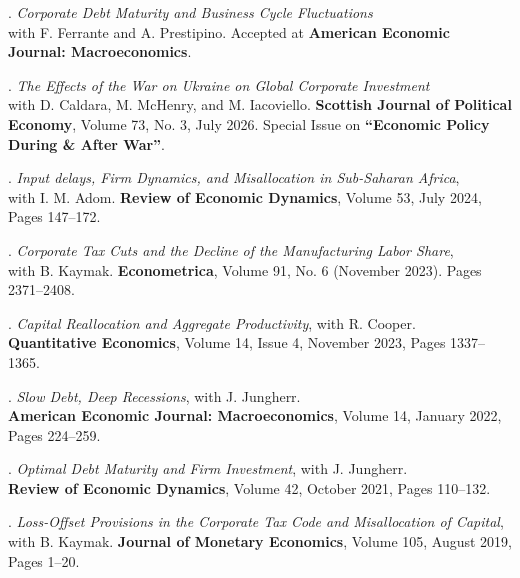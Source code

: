 \documentclass[11pt]{article}
\begin{document}
. \emph{Corporate Debt Maturity and Business Cycle Fluctuations} \\ \ind with F. Ferrante and A. Prestipino. Accepted at \textbf{American Economic Journal: Macroeconomics}.


. \emph{The Effects of the War on Ukraine on Global Corporate Investment} \\ \ind with D. Caldara, M. McHenry, and M. Iacoviello. \textbf{Scottish Journal of Political Economy}, Volume 73, No. 3, July 2026. Special Issue on \textbf{``Economic Policy During \& After War''}.

. \emph{Input delays, Firm Dynamics, and Misallocation in Sub-Saharan Africa},\\
\ind with I. M. Adom. \textbf{Review of Economic Dynamics}, Volume 53, July 2024, Pages 147--172.

. \emph{Corporate Tax Cuts and the Decline of the Manufacturing Labor Share},\\
\ind with B. Kaymak. \textbf{Econometrica}, Volume 91, No. 6 (November 2023). Pages 2371--2408.

. \emph{Capital Reallocation and Aggregate Productivity}, with R. Cooper. \\
\ind \textbf{Quantitative Economics}, Volume 14, Issue 4, November 2023, Pages 1337--1365.

. \emph{Slow Debt, Deep Recessions}, with J. Jungherr.\\
\ind \textbf{American Economic Journal: Macroeconomics}, Volume 14, January 2022, Pages 224--259.

. \emph{Optimal Debt Maturity and Firm Investment}, with J. Jungherr.\\
\ind \textbf{Review of Economic Dynamics}, Volume 42, October 2021, Pages 110--132.

. \emph{Loss-Offset Provisions in the Corporate Tax Code and Misallocation of Capital}, \\
\ind with B. Kaymak. \textbf{Journal of Monetary Economics}, Volume 105, August 2019, Pages 1--20.
\end{document}
